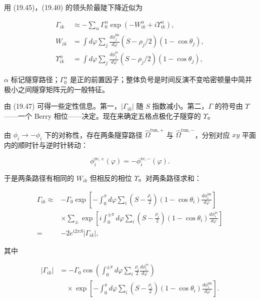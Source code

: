 用 (19.45)，(19.40) 的领头阶最陡下降近似为

\begin{align*}
\Gamma_{ik} & \approx - \sum_{\alpha} \Gamma_{0}^{\alpha} \exp \left( - W_{ik}^{\alpha} + i \Upsilon_{ik}^{\alpha} \right) ,\\
W_{ik} & = \int d \varphi \sum_{j} \frac {d \phi_{j}^{\mathrm{im}}}{d \varphi} \left( S - \rho_{j} /2 \right) \left( 1 - \cos \theta_{j} \right) ,\\
\Upsilon_{ik}^{\alpha} & = \int d \varphi \sum_{j} \frac {d \phi_{j}^{\mathrm{re}}}{d \varphi} \left( S - \rho_{j} /2 \right) \left( 1 - \cos \theta_{j} \right) ,
\tag{19.47}
\end{align*}

$\alpha$ 标记隧穿路径；$\Gamma_{0}^{\alpha}$ 是正的前置因子；整体负号是时间反演不变哈密顿量中简并极小之间隧穿矩阵元的一般特征。

由 (19.47) 可得一些定性信息。第一，$|\Gamma_{ik}|$ 随 $S$ 指数减小。第二，$\Gamma$ 的符号由 $\Upsilon$——一个 Berry 相位——决定。现在来确定五格点极化子隧穿的 $\Upsilon$。

由 $\phi_{i}\rightarrow-\phi_{i}$ 下的对称性，存在两条隧穿路径 $\hat{\Omega}^{\mathrm{tun},+}$ 与 $\hat{\Omega}^{\mathrm{tun},-}$，分别对应 $xy$ 平面内的顺时针与逆时针转动：

\begin{equation*}
\phi_{i}^{\mathrm{re}, +} ( \varphi ) = - \phi_{i}^{\mathrm{re}, -} ( \varphi ).
\tag{19.48}
\end{equation*}

于是两条路径有相同的 $W_{ik}$ 但相反的相位 $\Upsilon$。对两条路径求和：

\begin{align*}
\Gamma_{ik} \approx & - \Gamma_{0} \exp \left[ - \int_ {0} ^ {\pi} d \varphi \sum_{i} \left( S - \frac {\rho_{i}}{2} \right) \left( 1 - \cos \theta_{i} \right) \frac {d \phi_{i}^{\mathrm{im}}}{d \varphi} \right]\\
& \times \sum_{\pm} \exp \left[ i \int_ {0} ^ {\pm \pi} d \varphi \sum_{i} \left( S - \frac {\rho_{i}}{2} \right) \left( 1 - \cos \theta_{i} \right) \frac {d \phi_{i}^{\mathrm{re}}}{d \varphi} \right]\\
= & - 2 e ^ {i 2 \pi S} \left| \Gamma_{ik} \right| ,
\tag{19.49}
\end{align*}

其中

\begin{align*}
\left| \Gamma_{ik} \right| & = - \Gamma_{0} \cos \left( \int_ {0} ^ {\pm \pi} d \varphi \sum_{i} \frac {\rho_{i}}{2} \frac {d \phi_{i}^{\mathrm{re}}}{d \varphi} \right)\\
& \quad \times \exp \left[ - \int_ {0} ^ {\pi} d \varphi \sum_{i} \left( S - \frac {\rho_{i}}{2} \right) \left( 1 - \cos \theta_{i} \right) \frac {d \phi_{i}^{\mathrm{im}}}{d \varphi} \right] .
\tag{19.50}
\end{align*}

